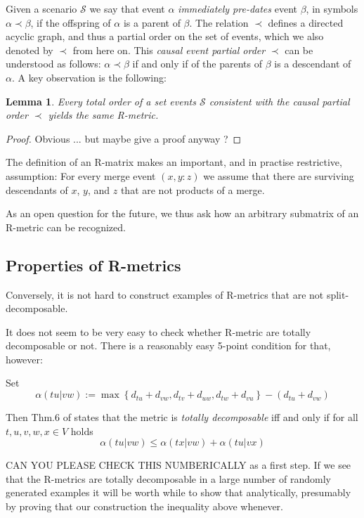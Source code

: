 \documentclass{article}
\newtheorem{lemma}[theorem]{Lemma}
\newcommand{\TODO}[1]{\begingroup\color{red}#1\endgroup}
\begin{document}
Given a scenario $\mathcal{S}$ we say that event $\alpha$ \emph{immediately
  pre-dates} event $\beta$, in symbols $\alpha \prec\beta$, if the
offspring of $\alpha$ is a parent of $\beta$. The relation $\prec$ defines
a directed acyclic graph, and thus a partial order on the set of events,
which we also denoted by $\prec$ from here on. This \emph{causal event
  partial order} $\prec$ can be understood as follows: $\alpha\prec\beta$
if and only if of the parents of $\beta$ is a descendant of $\alpha$. A key
observation is the following:
\begin{lemma}
  Every total order of a set events $\mathcal{S}$ consistent with the
  causal partial order $\prec$ yields the same R-metric.
\end{lemma}
\begin{proof}
  Obvious ... but maybe give a proof anyway ? 
\end{proof}















The definition of an R-matrix makes an important, and in practise
restrictive, assumption: For every merge event $(x,y:z)$ we assume that
there are surviving descendants of $x$, $y$, and $z$ that are not products
of a merge.

\TODO{As an open question for the future, we thus ask how an arbitrary 
submatrix of an R-metric can be recognized.} 

\subsection*{Properties of R-metrics} 




Conversely, it is not hard to construct examples of R-metrics that are not
split-decomposable.







\TODO{It does not seem to be very easy to check whether R-metric are 
totally decomposable or not. There is a reasonably easy 5-point condition
for that, however:

Set 
\begin{equation} 
  \alpha(tu|vw) := 
  \max\left\{ d_{tu}+d_{vw}, d_{tv}+d_{uw}, d_{tw}+d_{vu} \right\} -
             (d_{tu}+d_{vw})
\end{equation} 

Then Thm.6 of \cite{Bandelt:92} states that the metric is \emph{totally
  decomposable} iff and only if for all $t,u,v,w,x\in V$ holds 
\begin{equation} 
  \alpha(tu|vw) \le \alpha(tx|vw)+\alpha(tu|vx)
\end{equation} 

CAN YOU PLEASE CHECK THIS NUMBERICALLY as a first step. If we see that the 
R-metrics are totally decomposable in a large number of randomly generated
examples it will be worth while to show that analytically, presumably by 
proving that our construction the inequality above whenever.
}
\end{document}
